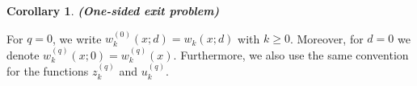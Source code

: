 \documentclass[12pt,reqno]{amsart}
\newcommand{\blue}{\textcolor[rgb]{0.00,0.00,1.00}}
\newtheorem{corol}[theorem]{Corollary}
\theoremstyle{definition}
\theoremstyle{remark}
\begin{document}
\begin{corol}{\textbf{(One-sided exit problem)}}
\begin{itemize}
	\end{itemize}
	\end{corol}
For $q=0$, we  write $w_k^{(0)}(x;d)=w_k(x;d)$ with $k \geq 0$.
Moreover, for $d=0$ we denote $w_k^{(q)}(x;0)=w_k^{(q)}(x)$.
Furthermore, we also use the same convention for the functions $z^{(q)}_k$ and $u^{(q)}_k$.
\end{document}
